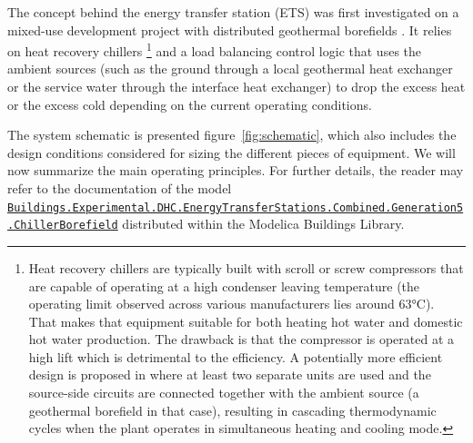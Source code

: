 The concept behind the energy transfer station (ETS) was first investigated on a mixed-use development project with distributed geothermal borefields \cite{WetterHu2019}.
It relies on heat recovery chillers%
\footnote{Heat recovery chillers are typically built with scroll or screw compressors that are capable of operating at a high condenser leaving temperature (the operating limit observed across various manufacturers lies around 63°C). That makes that equipment suitable for both heating hot water and domestic hot water production. The drawback is that the compressor is operated at a high lift which is detrimental to the efficiency. A potentially more efficient design is proposed in \cite{Cline2020} where at least two separate units are used and the source-side circuits are connected together with the ambient source (a geothermal borefield in that case), resulting in cascading thermodynamic cycles when the plant operates in simultaneous heating and cooling mode.}
and a load balancing control logic that uses the ambient sources (such as the ground through a local geothermal heat exchanger or the service water through the interface heat exchanger) to drop the excess heat or the excess cold depending on the current operating conditions.

The system schematic is presented figure~\ref{fig:schematic}, which also includes the design conditions considered for sizing the different pieces of equipment.
We will now summarize the main operating principles. For further details, the reader may refer to the documentation of the model \href{https://simulationresearch.lbl.gov/modelica/releases/v8.0.0/help/Buildings\_Experimental\_DHC\_EnergyTransferStations\_Combined\_Generation5.html#Buildings.Experimental.DHC.EnergyTransferStations.Combined.Generation5.ChillerBorefield}{\lstinline|Buildings.Experimental.DHC.EnergyTransferStations.Combined.Generation5.ChillerBorefield|} distributed within the Modelica Buildings Library.

